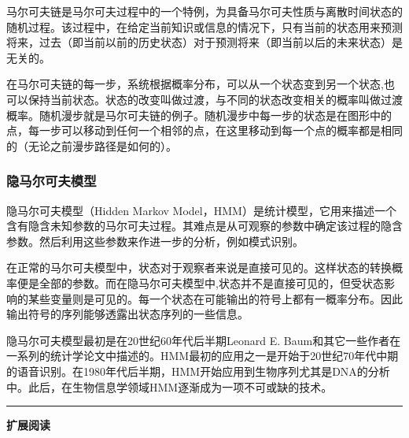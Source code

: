 \documentclass[11pt,a4paper,twoside]{book}
\begin{document}
马尔可夫链是马尔可夫过程中的一个特例，为具备马尔可夫性质与离散时间状态的随机过程。该过程中，在给定当前知识或信息的情况下，只有当前的状态用来预测将来，过去（即当前以前的历史状态）对于预测将来（即当前以后的未来状态）是无关的。

在马尔可夫链的每一步，系统根据概率分布，可以从一个状态变到另一个状态,也可以保持当前状态。状态的改变叫做过渡，与不同的状态改变相关的概率叫做过渡概率。随机漫步就是马尔可夫链的例子。随机漫步中每一步的状态是在图形中的点，每一步可以移动到任何一个相邻的点，在这里移动到每一个点的概率都是相同的（无论之前漫步路径是如何的）。
\subsubsection{隐马尔可夫模型}
隐马尔可夫模型（Hidden Markov Model，HMM）是统计模型，它用来描述一个含有隐含未知参数的马尔可夫过程。其难点是从可观察的参数中确定该过程的隐含参数。然后利用这些参数来作进一步的分析，例如模式识别。

在正常的马尔可夫模型中，状态对于观察者来说是直接可见的。这样状态的转换概率便是全部的参数。而在隐马尔可夫模型中,状态并不是直接可见的，但受状态影响的某些变量则是可见的。每一个状态在可能输出的符号上都有一概率分布。因此输出符号的序列能够透露出状态序列的一些信息。

隐马尔可夫模型最初是在20世纪60年代后半期Leonard E. Baum和其它一些作者在一系列的统计学论文中描述的。HMM最初的应用之一是开始于20世纪70年代中期的语音识别。在1980年代后半期，HMM开始应用到生物序列尤其是DNA的分析中。此后，在生物信息学领域HMM逐渐成为一项不可或缺的技术。

\vspace{0.5cm}
\hrule height 3pt

\noindent
{\large \bfseries \HandPencilLeft 扩展阅读}
\end{document}
